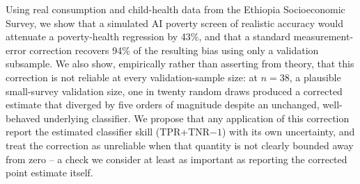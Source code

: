 \documentclass[12pt]{article}
\begin{document}
Using real consumption and child-health data from the Ethiopia Socioeconomic Survey, we show that a simulated AI poverty screen of realistic accuracy would attenuate a poverty-health regression by 43\%, and that a standard measurement-error correction recovers 94\% of the resulting bias using only a validation subsample. We also show, empirically rather than asserting from theory, that this correction is not reliable at every validation-sample size: at $n=38$, a plausible small-survey validation size, one in twenty random draws produced a corrected estimate that diverged by five orders of magnitude despite an unchanged, well-behaved underlying classifier. We propose that any application of this correction report the estimated classifier skill (TPR+TNR$-1$) with its own uncertainty, and treat the correction as unreliable when that quantity is not clearly bounded away from zero -- a check we consider at least as important as reporting the corrected point estimate itself.



\end{document}
